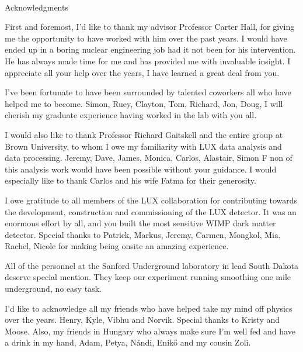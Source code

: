 
\renewcommand{\baselinestretch}{2}
\small\normalsize
\hbox{\ }
 
\vspace{-.65in}

\begin{center}
\large{Acknowledgments} 
\end{center} 

\vspace{1ex}


First and foremost, I'd like to thank my advisor Professor Carter Hall, for giving me the opportunity to have worked with him over the past years. I would have ended up in a boring nuclear engineering job had it not been for his intervention. He has always made time for me and has provided me with invaluable insight. I appreciate all your help over the years, I have learned a great deal from you.

I've been fortunate to have been surrounded by talented coworkers all who have helped me to become. Simon, Ruey, Clayton, Tom, Richard, Jon, Doug, I will cherish my graduate experience having worked in the lab with you all.

I would also like to thank Professor Richard Gaitskell and the entire group at Brown University, to whom I owe my familiarity with LUX data analysis and data processing. Jeremy, Dave, James, Monica, Carlos, Alastair, Simon F non of this analysis work would have been possible without your guidance. I would especially like to thank Carlos and his wife Fatma for their generosity.

I owe gratitude to all members of the LUX collaboration for contributing towards the development, construction and commissioning of the LUX detector. It was an enormous effort by all, and you built the most sensitive WIMP dark matter detector. Special thanks to Patrick, Markus, Jeremy, Carmen, Mongkol, Mia, Rachel, Nicole for making being onsite an amazing experience.

All of the personnel at the Sanford Underground laboratory in lead South Dakota deserve special mention. They keep our experiment running smoothing one mile underground, no easy task. 

I'd like to acknowledge all my friends who have helped take my mind off physics over the years. Henry, Kyle, Vibhu and Norvik. Special thanks to Kristy and Moose. Also, my friends in Hungary who always make sure I'm well fed and have a drink in my hand, Adam, Petya, N\'{a}ndi, Enik\H{o} and my cousin Zoli. 

